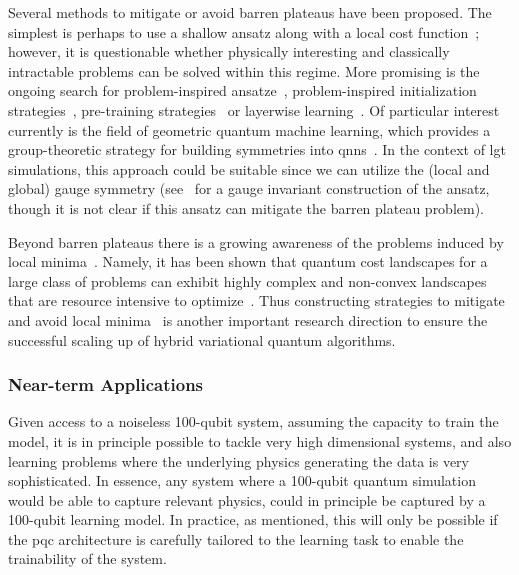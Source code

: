 Several methods to mitigate or avoid barren plateaus have been proposed. The simplest is perhaps to use a shallow ansatz along with a local cost function~\cite{2021NatCo..12.1791C, 2018NatCo...9.4812M}; however, it is questionable whether physically interesting and classically intractable problems can be solved within this regime. More promising is the ongoing search for problem-inspired ansatze~\cite{PhysRevX.11.041011,PhysRevLett.129.270501,2022arXiv220900292C,zhang2020toward,2020arXiv200802941W}, problem-inspired initialization strategies~\cite{2019arXiv190305076G}, pre-training strategies~\cite{Huggins_2019, dborin2022pretraining, rudolph2022synergy, rudolph2022decomposition, cheng2022clifford, niu2023warm} or layerwise learning~\cite{2020arXiv200614904S}. Of particular interest currently is the field of geometric quantum machine learning, which provides a group-theoretic strategy for building symmetries into \gls{qnn}s~\cite{larocca2022group, meyer2022exploiting, 2022arXiv220714413S, 2022arXiv221008566N}. 
In the context of \gls{lgt} simulations, this approach could be suitable since we can utilize the (local and global) gauge symmetry (see~\cite{Mazzola2021} for a gauge invariant construction of the ansatz, though it is not clear if this ansatz can mitigate the barren plateau problem).

Beyond barren plateaus there is a growing awareness of the problems induced by local minima~\cite{Bittel2021Training, you2021exponentially, rivera2021avoiding, anschuetz2022beyond}. Namely, it has been shown that quantum cost landscapes for a large class of problems can exhibit highly complex and non-convex landscapes that are resource intensive to optimize~\cite{Bittel2021Training, you2021exponentially, anschuetz2022beyond}. Thus constructing strategies to mitigate and avoid local minima~\cite{ rivera2021avoiding} is another important research direction to ensure the successful scaling up of hybrid variational quantum algorithms.

\subsubsection{Near-term Applications}
Given access to a noiseless 100-qubit system, assuming the capacity to train the model, it is in principle possible to tackle very high dimensional systems, and also learning problems where the underlying physics generating the data is very sophisticated. In essence, any system where a 100-qubit quantum simulation would be able to capture relevant physics, could in principle be captured by a 100-qubit learning model. In practice, as mentioned, this will only be possible if the \gls{pqc} architecture is carefully tailored to the learning task to enable the trainability of the system.


